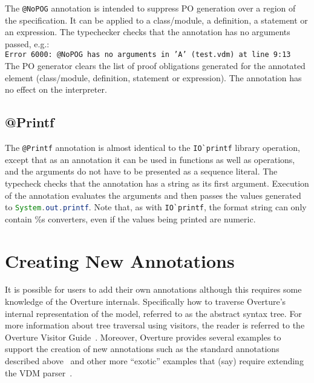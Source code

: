 The \lstinline[language=VDM++]|@NoPOG| annotation is intended to
suppress PO generation over a region of the specification. It can be
applied to a class/module, a definition, a statement or an
expression. The typechecker checks
that the annotation has no arguments passed, e.g.:\\

\noindent \texttt{Error 6000: @NoPOG has no arguments in 'A'
  (test.vdm) at line 9:13}\\

The PO generator clears the list of proof obligations generated for
the annotated element (class/module, definition, statement or
expression). The annotation has no effect on the interpreter.

\subsection{@Printf}

The \lstinline[language=VDM++]|@Printf| annotation is almost identical
to the \lstinline[language=VDM++]|IO`printf| library operation, except
that as an annotation it can be used in functions as well as
operations, and the arguments do not have to be presented as a
sequence literal. The typecheck checks that the annotation has a
string as its first argument. Execution of the annotation evaluates
the arguments and then passes the values generated to
\lstinline[language=Java]|System.out.printf|. Note that, as with
\lstinline[language=VDM++]|IO`printf|, the format string can only
contain \%s converters, even if the values being printed are numeric.

\section{Creating New Annotations}

It is possible for users to add their own annotations although this
requires some knowledge of the Overture internals. Specifically how to
traverse Overture's internal representation of the model, referred to
as the abstract syntax tree. For more information about tree traversal
using visitors, the reader is referred to the Overture Visitor
Guide~\cite{VisitorGuide}. Moreover, Overture provides several
examples to support the creation of new annotations such as the
standard annotations described above~\cite{AnnotationsProvided} and
other more ``exotic'' examples that (say) require extending the VDM
parser~\cite{AnnotationsExamples}.

